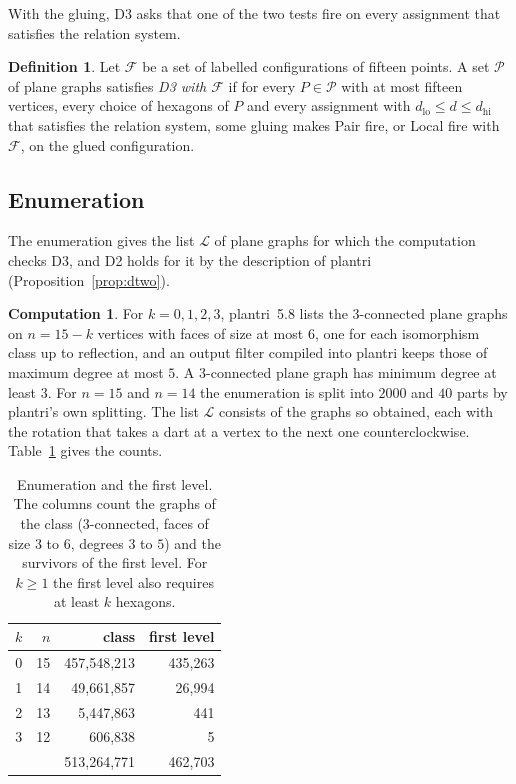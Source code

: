 \documentclass[12pt]{amsart}
\theoremstyle{definition}
\newtheorem{definition}[theorem]{Definition}
\newtheorem{step}[theorem]{Computation}
\theoremstyle{plain}
\theoremstyle{definition}
\newcommand{\dlo}{d_{\mathrm{lo}}}
\newcommand{\dhi}{d_{\mathrm{hi}}}
\newcommand{\leanmap}[1]{\ignorespaces}
\newcommand{\codemap}[1]{\ignorespaces}
\newcommand{\mapnote}[1]{\ignorespaces}
\begin{document}
With the gluing, D3 asks that one of the two tests fire on every assignment that satisfies the relation system.

\begin{definition}\label{def:dthree}\leanmap{Tammes15.Killed, Tammes15.HexChoice, Tammes15.Frame}
Let $\mathcal F$ be a set of labelled configurations of fifteen points. A set $\mathcal P$ of plane graphs satisfies \emph{D3 with $\mathcal F$} if for every $P\in \mathcal P$ with at most fifteen vertices, every choice of hexagons of $P$ and every assignment with $\dlo\le d\le\dhi$ that satisfies the relation system, some gluing makes Pair fire, or Local fire with $\mathcal F$, on the glued configuration.
\end{definition}

\subsection{Enumeration}\label{sec:enum}
The enumeration gives the list $\mathcal L$ of plane graphs for which the computation checks D3, and D2 holds for it by the description of plantri (Proposition~\ref{prop:dtwo}).

\begin{step}\label{comp:enum}\codemap{code/impl1/stageA_check.sh > code/impl1/out/stageA_parts.txt}\mapnote{by plantri; its conclusion is D2 (Proposition \ref{prop:dtwo})}
For $k=0,1,2,3$, plantri~5.8 \cite{BM} lists the 3-connected plane graphs on $n=15-k$ vertices with faces of size at most $6$, one for each isomorphism class up to reflection, and an output filter compiled into plantri keeps those of maximum degree at most $5$. A 3-connected plane graph has minimum degree at least $3$. For $n=15$ and $n=14$ the enumeration is split into $2000$ and $40$ parts by plantri's own splitting. The list $\mathcal L$ consists of the graphs so obtained, each with the rotation that takes a dart at a vertex to the next one counterclockwise. Table~\ref{tab:enum} gives the counts.
\end{step}

\begin{table}[ht]
\caption{Enumeration and the first level. The columns count the graphs of the class (3-connected, faces of size $3$ to $6$, degrees $3$ to $5$) and the survivors of the first level. For $k\ge1$ the first level also requires at least $k$ hexagons.}\label{tab:enum}
\centering
\begin{tabular}{rrrr}
$k$ & $n$ & class & first level\\\hline
0 & 15 & 457{,}548{,}213 & 435{,}263\\
1 & 14 & 49{,}661{,}857 & 26{,}994\\
2 & 13 & 5{,}447{,}863 & 441\\
3 & 12 & 606{,}838 & 5\\\hline
 & & 513{,}264{,}771 & 462{,}703
\end{tabular}
\end{table}
\end{document}
